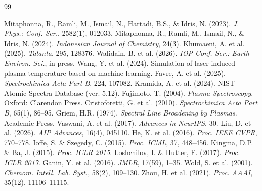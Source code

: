 \documentclass[12pt, a4paper]{article}
\begin{document}
\begingroup
\small
\begin{thebibliography}{99}

 Mitaphonna, R., Ramli, M., Ismail, N., Hartadi, B.S., \& Idris, N. (2023). \textit{J. Phys.: Conf. Ser.}, 2582(1), 012033.
 Mitaphonna, R., Ramli, M., Ismail, N., \& Idris, N. (2024). \textit{Indonesian Journal of Chemistry}, 24(3).
 Khumaeni, A. et al. (2025). \textit{Talanta}, 295, 128376.
 Walidain, B. et al. (2026). \textit{IOP Conf. Ser.: Earth Environ. Sci.}, in press.
 Wang, Y. et al. (2024). Simulation of laser-induced plasma temperature based on machine learning.
 Favre, A. et al. (2025). \textit{Spectrochimica Acta Part B}, 224, 107082.
 Kramida, A. et al. (2024). NIST Atomic Spectra Database (ver. 5.12).
 Fujimoto, T. (2004). \textit{Plasma Spectroscopy}. Oxford: Clarendon Press.
 Cristoforetti, G. et al. (2010). \textit{Spectrochimica Acta Part B}, 65(1), 86--95.
 Griem, H.R. (1974). \textit{Spectral Line Broadening by Plasmas}. Academic Press.
 Vaswani, A. et al. (2017). \textit{Advances in NeurIPS}, 30.
 Liu, D. et al. (2026). \textit{AIP Advances}, 16(4), 045110.
 He, K. et al. (2016). \textit{Proc. IEEE CVPR}, 770--778.
 Ioffe, S. \& Szegedy, C. (2015). \textit{Proc. ICML}, 37, 448--456.
 Kingma, D.P. \& Ba, J. (2015). \textit{Proc. ICLR 2015}.
 Loshchilov, I. \& Hutter, F. (2017). \textit{Proc. ICLR 2017}.
 Ganin, Y. et al. (2016). \textit{JMLR}, 17(59), 1--35.
 Wold, S. et al. (2001). \textit{Chemom. Intell. Lab. Syst.}, 58(2), 109--130.
 Zhou, H. et al. (2021). \textit{Proc. AAAI}, 35(12), 11106--11115.

\end{thebibliography}
\endgroup
\end{document}
